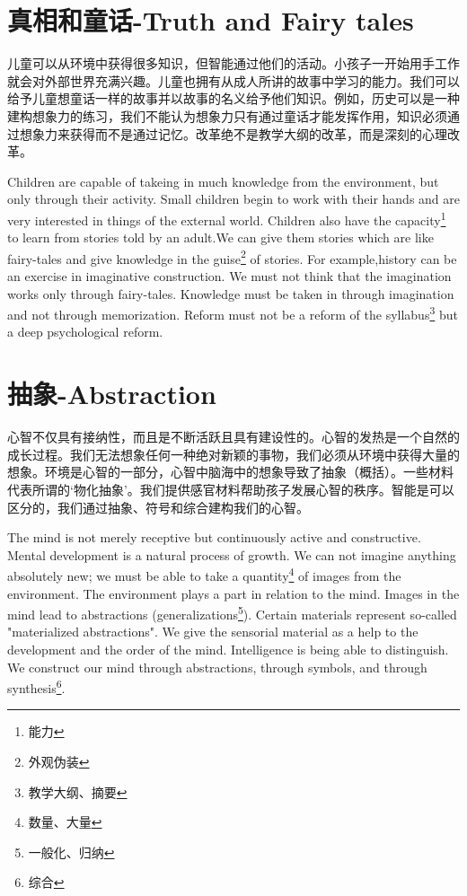 \documentclass[lang=cn,10pt]{elegantbook}
\begin{document}
\chapter{真相和童话-Truth and Fairy tales}

儿童可以从环境中获得很多知识，但智能通过他们的活动。小孩子一开始用手工作就会对外部世界充满兴趣。儿童也拥有从成人所讲的故事中学习的能力。我们可以给予儿童想童话一样的故事并以故事的名义给予他们知识。例如，历史可以是一种建构想象力的练习，我们不能认为想象力只有通过童话才能发挥作用，知识必须通过想象力来获得而不是通过记忆。改革绝不是教学大纲的改革，而是深刻的心理改革。

Children are capable of takeing in much knowledge from the environment, but only through their activity. Small children begin to work with their hands and are very interested in things of the external world. Children also have the capacity\footnote{能力} to learn from stories told by an adult.We can give them stories which are like fairy-tales and give knowledge in the guise\footnote{外观伪装} of stories. For example,history can be an exercise in imaginative construction. We must not think that the imagination works only through fairy-tales. Knowledge must be taken in through imagination and not through memorization. Reform must not be a reform of the syllabus\footnote{教学大纲、摘要} but a deep psychological reform.

\chapter{抽象-Abstraction}

心智不仅具有接纳性，而且是不断活跃且具有建设性的。心智的发热是一个自然的成长过程。我们无法想象任何一种绝对新颖的事物，我们必须从环境中获得大量的想象。环境是心智的一部分，心智中脑海中的想象导致了抽象（概括）。一些材料代表所谓的‘物化抽象’。我们提供感官材料帮助孩子发展心智的秩序。智能是可以区分的，我们通过抽象、符号和综合建构我们的心智。

The mind is not merely receptive but continuously active and constructive. Mental development is a natural process of growth. We can not imagine anything absolutely new; we must be able to take a quantity\footnote{数量、大量} of images from the environment. The environment plays a part in relation to the mind. Images in the mind lead to abstractions (generalizations\footnote{一般化、归纳}). Certain materials represent so-called "materialized abstractions". We give the sensorial material as a help to the development and the order of the mind. Intelligence is being able to distinguish. We construct our mind through abstractions, through symbols, and through synthesis\footnote{综合}.
\end{document}
